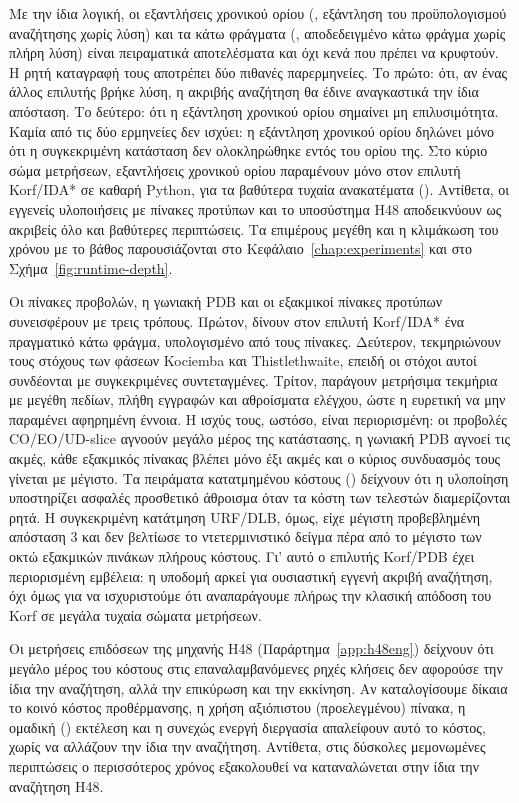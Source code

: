 Με την ίδια λογική, οι εξαντλήσεις χρονικού ορίου (, εξάντληση του προϋπολογισμού αναζήτησης χωρίς λύση) και τα κάτω φράγματα (, αποδεδειγμένο κάτω φράγμα χωρίς πλήρη λύση) είναι πειραματικά αποτελέσματα και όχι κενά που πρέπει να κρυφτούν. Η ρητή καταγραφή τους αποτρέπει δύο πιθανές παρερμηνείες. Το πρώτο: ότι, αν ένας άλλος επιλυτής βρήκε λύση, η ακριβής αναζήτηση θα έδινε αναγκαστικά την ίδια απόσταση. Το δεύτερο: ότι η εξάντληση χρονικού ορίου σημαίνει μη επιλυσιμότητα. Καμία από τις δύο ερμηνείες δεν ισχύει: η εξάντληση χρονικού ορίου δηλώνει μόνο ότι η συγκεκριμένη κατάσταση δεν ολοκληρώθηκε εντός του ορίου της. Στο κύριο σώμα μετρήσεων, εξαντλήσεις χρονικού ορίου παραμένουν μόνο στον επιλυτή Korf/IDA* σε καθαρή Python, για τα βαθύτερα τυχαία ανακατέματα (). Αντίθετα, οι εγγενείς υλοποιήσεις με πίνακες προτύπων και το υποσύστημα H48 αποδεικνύουν ως ακριβείς όλο και βαθύτερες περιπτώσεις. Τα επιμέρους μεγέθη και η κλιμάκωση του χρόνου με το βάθος παρουσιάζονται στο Κεφάλαιο~\ref{chap:experiments} και στο Σχήμα~\ref{fig:runtime-depth}.

Οι πίνακες προβολών, η γωνιακή PDB και οι εξακμικοί πίνακες προτύπων συνεισφέρουν με τρεις τρόπους. Πρώτον, δίνουν στον επιλυτή Korf/IDA* ένα πραγματικό κάτω φράγμα, υπολογισμένο από τους πίνακες. Δεύτερον, τεκμηριώνουν τους στόχους των φάσεων Kociemba και Thistlethwaite, επειδή οι στόχοι αυτοί συνδέονται με συγκεκριμένες συντεταγμένες. Τρίτον, παράγουν μετρήσιμα τεκμήρια με μεγέθη πεδίων, πλήθη εγγραφών και αθροίσματα ελέγχου, ώστε η ευρετική να μην παραμένει αφηρημένη έννοια. Η ισχύς τους, ωστόσο, είναι περιορισμένη: οι προβολές CO/EO/UD-slice αγνοούν μεγάλο μέρος της κατάστασης, η γωνιακή PDB αγνοεί τις ακμές, κάθε εξακμικός πίνακας βλέπει μόνο έξι ακμές και ο κύριος συνδυασμός τους γίνεται με μέγιστο. Τα πειράματα κατατμημένου κόστους () δείχνουν ότι η υλοποίηση υποστηρίζει ασφαλές προσθετικό άθροισμα όταν τα κόστη των τελεστών διαμερίζονται ρητά. Η συγκεκριμένη κατάτμηση URF/DLB, όμως, είχε μέγιστη προβεβλημένη απόσταση 3 και δεν βελτίωσε το ντετερμινιστικό δείγμα πέρα από το μέγιστο των οκτώ εξακμικών πινάκων πλήρους κόστους. Γι' αυτό ο επιλυτής Korf/PDB έχει περιορισμένη εμβέλεια: η υποδομή αρκεί για ουσιαστική εγγενή ακριβή αναζήτηση, όχι όμως για να ισχυριστούμε ότι αναπαράγουμε πλήρως την κλασική απόδοση του Korf σε μεγάλα τυχαία σώματα μετρήσεων.

Οι μετρήσεις επιδόσεων της μηχανής H48 (Παράρτημα~\ref{app:h48eng}) δείχνουν ότι μεγάλο μέρος του κόστους στις επαναλαμβανόμενες ρηχές κλήσεις δεν αφορούσε την ίδια την αναζήτηση, αλλά την επικύρωση και την εκκίνηση. Αν καταλογίσουμε δίκαια το κοινό κόστος προθέρμανσης, η χρήση αξιόπιστου (προελεγμένου) πίνακα, η ομαδική () εκτέλεση και η συνεχώς ενεργή διεργασία απαλείφουν αυτό το κόστος, χωρίς να αλλάζουν την ίδια την αναζήτηση. Αντίθετα, στις δύσκολες μεμονωμένες περιπτώσεις ο περισσότερος χρόνος εξακολουθεί να καταναλώνεται στην ίδια την αναζήτηση H48.

